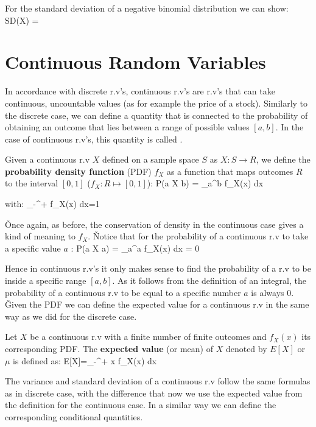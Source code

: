 For the standard deviation of a negative binomial distribution we can show:
\bse
SD(X) = 
\ese

\section{Continuous Random Variables}

In accordance with discrete r.v's, continuous r.v's are r.v's that can take continuous, uncountable values (as for
example the price of a stock). Similarly to the discrete case, we can define a quantity that is connected to the
probability of obtaining an outcome that lies between a range of possible values $[a,b]$. In the case of continuous
r.v's, this quantity is called .

Given a continuous r.v $X$ defined on a sample space $S$ as $X \colon S \to R$, we define the \textbf{probability
density function} (PDF) $f_{X}$ as a function that maps outcomes $R$ to the interval $[0,1]$ ($f_{X}:R\mapsto [0,1]$):
\bse
P(a \leq X \leq b) = \int_{a}^{b} f_{X}(x) dx
\ese

with:
\bse
\int_{-\infty}^{+\infty} f_{X}(x) dx=1
\ese
\ed

\v

Once again, as before, the conservation of density in the continuous case gives a kind of  meaning to
$f_{X}$. \v

Notice that for the probability of a continuous r.v to take a specific value
$a$ :
\bse
P(a \leq X \leq a) = \int_{a}^{a} f_{X}(x) dx = 0
\ese

Hence in continuous r.v's it only makes sense to find the probability of a r.v to be inside a specific range $[a,b]$.
As it follows from the definition of an integral, the probability of a continuous r.v to be equal to a specific
number $a$ is always 0. \v

Given the PDF we can define the expected value for a continuous r.v in the same way as we did for the discrete case.

Let $X$ be a continuous r.v with a finite number of finite outcomes and $f_{X}(x)$ its corresponding PDF. The
\textbf{expected value} (or mean) of $X$ denoted by $E[X]$ or $\mu$ is defined as:
\bse
E[X]=\int_{-\infty}^{+\infty} x f_{X}(x) dx
\ese
\ed

The variance and standard deviation of a continuous r.v follow the same formulas as in discrete case, with the
difference that now we use the expected value from the definition for the continuous case. In a similar way we can
define the corresponding conditional quantities.

